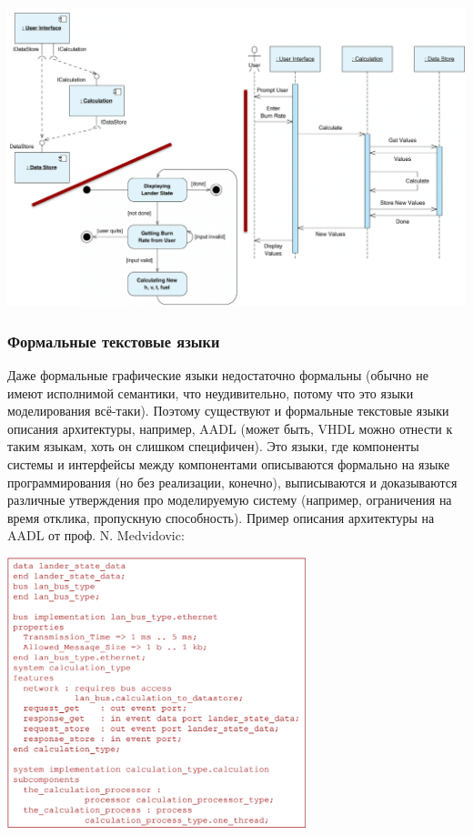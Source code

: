 \documentclass{../text-style}
\begin{document}
\begin{center}
    \includegraphics[width=\textwidth]{uml.png}
\end{center}

\subsubsection{Формальные текстовые языки}

Даже формальные графические языки недостаточно формальны (обычно не имеют исполнимой семантики, что неудивительно, потому что это языки моделирования всё-таки). Поэтому существуют и формальные текстовые языки описания архитектуры, например, AADL (может быть, VHDL можно отнести к таким языкам, хоть он слишком специфичен). Это языки, где компоненты системы и интерфейсы между компонентами описываются формально на языке программирования (но без реализации, конечно), выписываются и доказываются различные утверждения про моделируемую систему (например, ограничения на время отклика, пропускную способность). Пример описания архитектуры на AADL от проф. N. Medvidovic:

\begin{center}
    \includegraphics[width=0.65\textwidth]{aadl.png}
\end{center}
\end{document}
